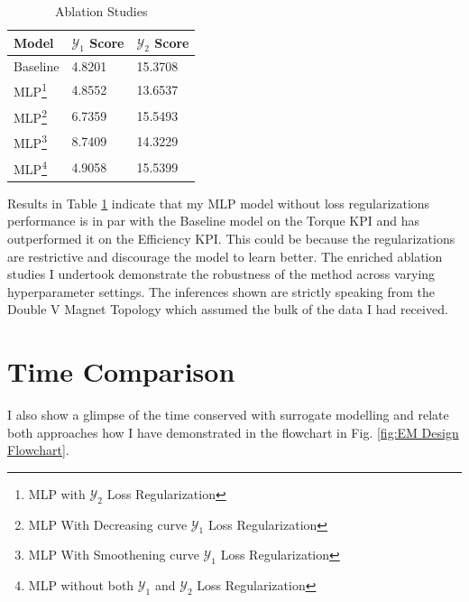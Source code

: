 \documentclass{report} %
\begin{document}
\begin{minipage}[t]{\textwidth}
    \begin{table}[H]
        \centering
        \begin{tabular}{|p{}|p{}|p{}|}
        \hline {\bf Model} & {\bf $\mathcal{Y}_1$ Score} & {\bf $\mathcal{Y}_2$ Score}\\
        \hline 
        Baseline & 4.8201 & 15.3708 \\
        MLP\footnote{MLP with $\mathcal{Y}_2$ Loss Regularization} & 4.8552 & 13.6537  \\
        MLP\footnote{MLP With Decreasing curve $\mathcal{Y}_1$ Loss Regularization} & 6.7359 & 15.5493 \\
        MLP\footnote{MLP With Smoothening curve $\mathcal{Y}_1$ Loss Regularization} & 8.7409 & 14.3229 \\
        MLP\footnote{MLP without both $\mathcal{Y}_1$ and $\mathcal{Y}_2$ Loss Regularization} &  4.9058 & 15.5399  \\
        \hline
        \end{tabular}
        \caption{Ablation Studies}
        \label{tab:Ablation Studies}
    \end{table}
\end{minipage}

\vspace{1em} %

Results in Table \ref{tab:Ablation Studies} indicate that my \ac{MLP} model without loss regularizations performance is in par with the Baseline model on the Torque 
\ac{KPI} and has outperformed it on the Efficiency \ac{KPI}. This could be because the regularizations are restrictive and discourage the model to learn better.
The enriched ablation studies I undertook demonstrate the robustness of the method across varying hyperparameter settings.
The inferences shown are strictly speaking from the Double V Magnet Topology which assumed the bulk of the data I had received.

\section{Time Comparison}\label{sec:Time Comparison}

I also show a glimpse of the time conserved with surrogate modelling and relate both approaches how I have demonstrated in the flowchart in Fig. 
\ref{fig:EM Design Flowchart}.
\end{document}
